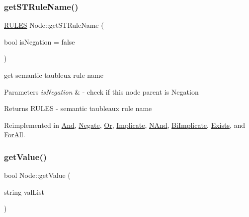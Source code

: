 \subsubsection{\texorpdfstring{get\+S\+T\+Rule\+Name()}{getSTRuleName()}}
{\footnotesize\ttfamily \hyperlink{proposition_2tableaux_2enum_8h_a70c93904c6a27d228050f922eb4fc3b8}{R\+U\+L\+ES} Node\+::get\+S\+T\+Rule\+Name (\begin{DoxyParamCaption}\item[{bool}]{is\+Negation = {\ttfamily false} }\end{DoxyParamCaption})\hspace{0.3cm}{\ttfamily [virtual]}}



get semantic taubleux rule name 


\begin{DoxyParams}{Parameters}
{\em is\+Negation} & -\/ check if this node parent is Negation \\
\hline
\end{DoxyParams}
\begin{DoxyReturn}{Returns}
R\+U\+L\+ES -\/ semantic taubleaux rule name 
\end{DoxyReturn}


Reimplemented in \hyperlink{class_and_a9b62ef9a38c6fe9ac96c958d46e30f7b}{And}, \hyperlink{class_negate_ac881a233c5a1e6f7669ea8ff70eda8f7}{Negate}, \hyperlink{class_or_a0fd1f6086987f7b1fe9fab9a196c1839}{Or}, \hyperlink{class_implicate_aa425e8cb25aec8dd2935346f61ebaefa}{Implicate}, \hyperlink{class_n_and_a8570a747f7f4aec32bb962227749566f}{N\+And}, \hyperlink{class_bi_implicate_a3ca1a9b3fd1805b56b72def494179ea3}{Bi\+Implicate}, \hyperlink{class_exists_aff7b8694345884d06bdd751e88fae041}{Exists}, and \hyperlink{class_for_all_a97e03dcd8f51824fe629487847b7c4dc}{For\+All}.

\mbox{\label{class_node_afd0c2045f3955e02e3aa1e2e987f10b2}} 
\subsubsection{\texorpdfstring{get\+Value()}{getValue()}}
{\footnotesize\ttfamily bool Node\+::get\+Value (\begin{DoxyParamCaption}\item[{string}]{val\+List }\end{DoxyParamCaption})\hspace{0.3cm}{\ttfamily [virtual]}}



